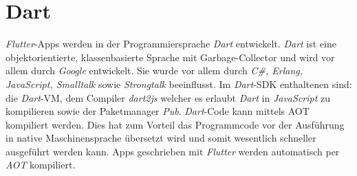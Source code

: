 \section{Dart}
\textit{Flutter}-Apps werden in der Programmiersprache \textit{Dart}
entwickelt. \textit{Dart} ist eine objektorientierte,
klassenbasierte Sprache mit Garbage-Collector und wird vor allem durch
\textit{Google} entwickelt. Sie wurde vor allem durch
\textit{C\#, Erlang, JavaScript, Smalltalk} sowie \textit{Strongtalk}
beeinflusst. Im \textit{Dart}-\ac{SDK} enthaltenen sind:
die \textit{Dart}-\ac{VM}, dem Compiler \textit{dart2js}
welcher es erlaubt \textit{Dart} in \textit{JavaScript}
zu kompilieren sowie der Paketmanager \textit{Pub}.
\textit{Dart}-Code kann mittels \ac{AOT} kompiliert werden.
Dies hat zum Vorteil das Programmcode vor der Ausführung in native
Maschinensprache übersetzt wird und somit wesentlich schneller ausgeführt
werden kann. Apps geschrieben mit \textit{Flutter} werden automatisch
per \textit{AOT} kompiliert.
\newpage
